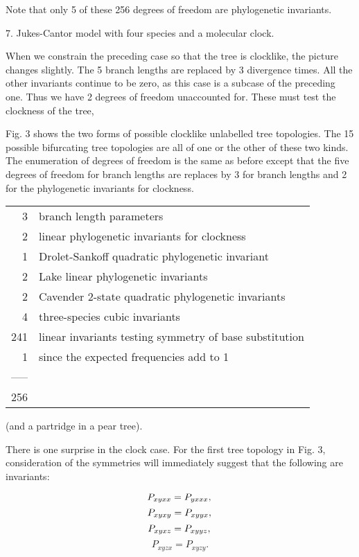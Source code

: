 Note that only 5 of these 256 degrees of freedom are phylogenetic invariants.
\bigskip

\centerline{7.  Jukes-Cantor model with four species and a molecular clock.}
\medskip

When we constrain the preceding case so that the tree is clocklike, the
picture changes slightly.  The 5 branch lengths are replaced by 3
divergence times.  All the other invariants continue to be zero, as this
case is a subcase of the preceding one.  Thus we have 2 degrees of
freedom unaccounted for.  These must test the clockness of the tree,

Fig. 3 shows the two forms of possible clocklike unlabelled
tree topologies.  The 15 possible bifurcating tree topologies are all of
one or the other of these two kinds.  The enumeration of degrees of freedom is
the same as before except that the five degrees of freedom for branch lengths
are replaces by 3 for branch lengths and 2 for the phylogenetic invariants 
for clockness.
\medskip

\begin{tabular}{r l}
              3  &   branch length parameters\\
              2  &   linear phylogenetic invariants for clockness\\
              1  &   Drolet-Sankoff quadratic phylogenetic invariant\\
              2  &   Lake linear phylogenetic invariants \\
              2  &   Cavender 2-state quadratic phylogenetic invariants\\
              4  &   three-species cubic invariants\\
            241  &   linear invariants testing symmetry of base substitution\\
              1  &   since the expected frequencies add to 1\\
           ----- & \\
            256  &
\end{tabular}
\medskip

(and a partridge in a pear tree).

There is one surprise in the clock case.  For the first tree topology in
Fig. 3, consideration of the symmetries will immediately suggest that the
following are invariants:

\medskip

\begin{equation} %
P_{xyxx} = P_{yxxx}, \\
\end{equation}
\begin{equation}
P_{xyxy} = P_{xyyx}, \\
\end{equation}
\begin{equation}
P_{xyxz} = P_{xyyz}, \\
\end{equation}
\begin{equation}
P_{xyzx} = P_{xyzy}.
\end{equation}



